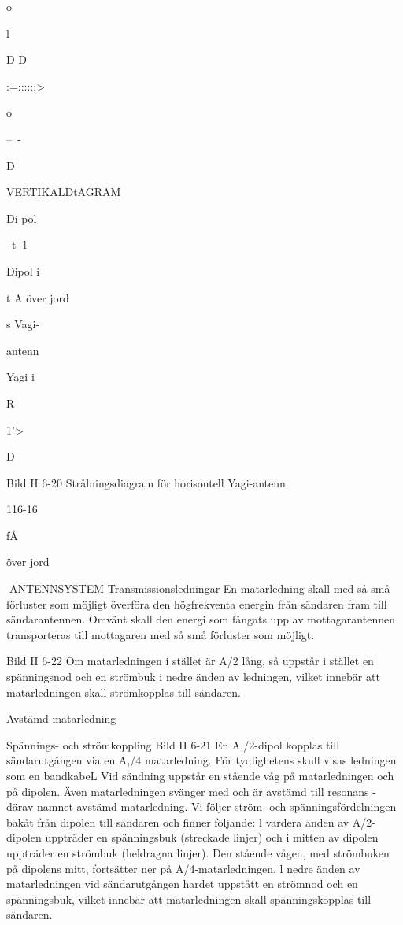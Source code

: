 \documentclass[a4paper,twoside,twocolumn,openright]{book}
\begin{document}
{{{{o

l

D D

:=:::::;>

o

--~-

D

VERTIKALDtAGRAM

Di pol

--t- l

Dipol i

t A över jord

s
Vagi-

antenn

Yagi i

R

1'>

D

Bild II 6-20 Strålningsdiagram för horisontell Yagi-antenn

116-16

fÅ

över jord

ANTENNSYSTEM
Transmissionsledningar
En matarledning skall med så små förluster
som möjligt överföra den högfrekventa energin från sändaren fram till sändarantennen.
Omvänt skall den energi som fångats upp
av mottagarantennen transporteras till mottagaren med så små förluster som möjligt.

Bild II 6-22
Om matarledningen i stället är A/2 lång, så
uppstår i stället en spänningsnod och en
strömbuk i nedre änden av ledningen, vilket
innebär att matarledningen skall strömkopplas till sändaren.

Avstämd matarledning

Spännings- och strömkoppling
Bild II 6-21
En A,/2-dipol kopplas till sändarutgången via
en A,/4 matarledning. För tydlighetens skull
visas ledningen som en bandkabeL
Vid sändning uppstår en stående våg på
matarledningen och på dipolen. Även matarledningen svänger med och är avstämd
till resonans - därav namnet avstämd matarledning.
Vi följer ström- och spänningsfördelningen bakåt från dipolen till sändaren och finner
följande:
l vardera änden av A/2-dipolen uppträder en spänningsbuk (streckade linjer) och
i mitten av dipolen uppträder en strömbuk
(heldragna linjer). Den stående vågen, med
strömbuken på dipolens mitt, fortsätter ner
på A/4-matarledningen. l nedre änden av
matarledningen vid sändarutgången hardet
uppstått en strömnod och en spänningsbuk,
vilket innebär att matarledningen skall
spänningskopplas till sändaren.

}}}}
\end{document}
